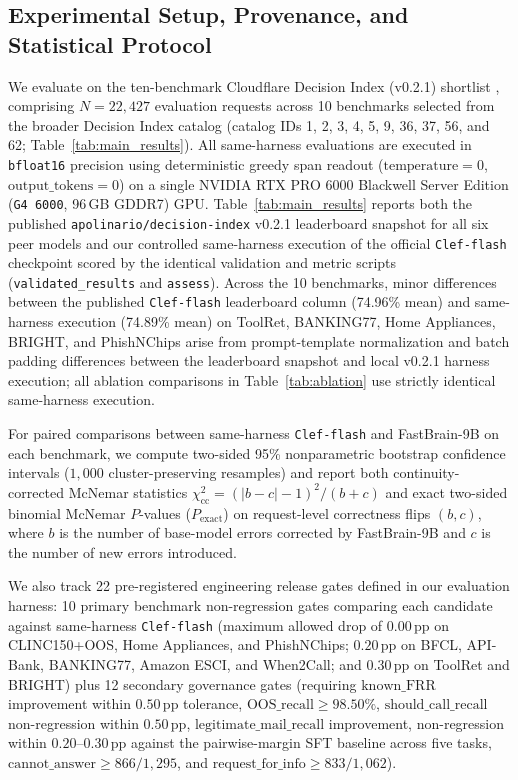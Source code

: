 \documentclass[10pt,twocolumn]{article}
\begin{document}
\subsection{Experimental Setup, Provenance, and Statistical Protocol}
We evaluate on the ten-benchmark Cloudflare Decision Index (v0.2.1) shortlist \citep{apolinario2026decisionindex}, comprising $N = 22{,}427$ evaluation requests across 10 benchmarks selected from the broader Decision Index catalog (catalog IDs 1, 2, 3, 4, 5, 9, 36, 37, 56, and 62; Table~\ref{tab:main_results}). All same-harness evaluations are executed in \texttt{bfloat16} precision using deterministic greedy span readout ($\text{temperature} = 0$, $\text{output\_tokens} = 0$) on a single NVIDIA RTX PRO 6000 Blackwell Server Edition (\texttt{G4 6000}, 96\,GB GDDR7) GPU. Table~\ref{tab:main_results} reports both the published \texttt{apolinario/decision-index} v0.2.1 leaderboard snapshot for all six peer models and our controlled same-harness execution of the official \texttt{Clef-flash} checkpoint scored by the identical validation and metric scripts (\texttt{validated\_results} and \texttt{assess}). Across the 10 benchmarks, minor differences between the published \texttt{Clef-flash} leaderboard column (74.96\% mean) and same-harness execution (74.89\% mean) on ToolRet, BANKING77, Home Appliances, BRIGHT, and PhishNChips arise from prompt-template normalization and batch padding differences between the leaderboard snapshot and local v0.2.1 harness execution; all ablation comparisons in Table~\ref{tab:ablation} use strictly identical same-harness execution.

For paired comparisons between same-harness \texttt{Clef-flash} and FastBrain-9B on each benchmark, we compute two-sided 95\% nonparametric bootstrap confidence intervals ($1{,}000$ cluster-preserving resamples) and report both continuity-corrected McNemar statistics $\chi^2_{\text{cc}} = (|b - c| - 1)^2 / (b + c)$ and exact two-sided binomial McNemar $P$-values ($P_{\text{exact}}$) on request-level correctness flips $(b, c)$, where $b$ is the number of base-model errors corrected by FastBrain-9B and $c$ is the number of new errors introduced.

We also track 22 pre-registered engineering release gates defined in our evaluation harness: 10 primary benchmark non-regression gates comparing each candidate against same-harness \texttt{Clef-flash} (maximum allowed drop of $0.00$\,pp on CLINC150+OOS, Home Appliances, and PhishNChips; $0.20$\,pp on BFCL, API-Bank, BANKING77, Amazon ESCI, and When2Call; and $0.30$\,pp on ToolRet and BRIGHT) plus 12 secondary governance gates (requiring $\text{known\_FRR}$ improvement within $0.50$\,pp tolerance, $\text{OOS\_recall} \ge 98.50\%$, $\text{should\_call\_recall}$ non-regression within $0.50$\,pp, $\text{legitimate\_mail\_recall}$ improvement, non-regression within $0.20\text{--}0.30$\,pp against the pairwise-margin SFT baseline across five tasks, $\text{cannot\_answer} \ge 866/1{,}295$, and $\text{request\_for\_info} \ge 833/1{,}062$).
\end{document}
